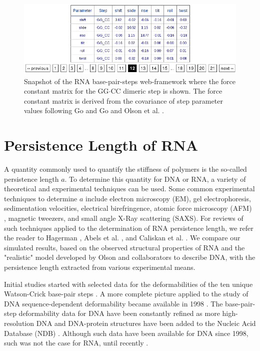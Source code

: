 \begin{figure}[htbp]
\centering
\includegraphics[angle=0, scale=0.54]{Chapter4/forceconst.png}
\caption{Snapshot of  the RNA base-pair-steps  web-framework where the
  force constant matrix for the GG$\cdot$CC dimeric step is shown. The
  force  constant  matrix  is  derived  from the  covariance  of  step
  parameter  values following  Go and  Go \cite{go1976}  and  Olson et
  al. \cite{olson1998}.}
\label{fig:forceconst}
\end{figure}  

\section{Persistence Length of RNA}
A quantity commonly used to  quantify the stiffness of polymers is the
so-called persistence  length $a$. To determine this  quantity for DNA
or RNA,  a variety of  theoretical and experimental techniques  can be
used.  Some  common experimental  techniques to determine  $a$ include
electron   microscopy   (EM),   gel   electrophoresis,   sedimentation
velocities, electrical birefringence,  atomic force microscopy (AFM) ,
magnetic  tweezers,  and small  angle  X-Ray  scattering (SAXS).   For
reviews  of  such  techniques  applied  to the  determination  of  RNA
persistence    length,    we   refer    the    reader   to    Hagerman
\cite{hagerman1997}, Abels  et al.  \cite{abels2005},  and Caliskan et
al.  \cite{caliskan2005}.  We compare  our simulated results, based on
the observed  structural properties of  RNA and the  "realistic" model
developed by Olson and collaborators \cite{marky1994a, maroun1988a} to
describe  DNA,  with the  persistence  length  extracted from  various
experimental means.

Initial studies started with  selected data for the deformabilities of
the ten unique Watson-Crick  base-pair steps \cite{olson1995}.  A more
complete  picture  applied  to  the study  of  DNA  sequence-dependent
deformability   became  available   in  1998   \cite{olson1998}.   The
base-pair-step deformability data for DNA have been constantly refined
as more high-resolution DNA and DNA-protein structures have been added
to  the   Nucleic  Acid  Database   (NDB)  \cite{balasubramanian2009}.
Although such  data have been available  for DNA since  1998, such was
not the case for RNA, until recently \cite{olson2009}.

